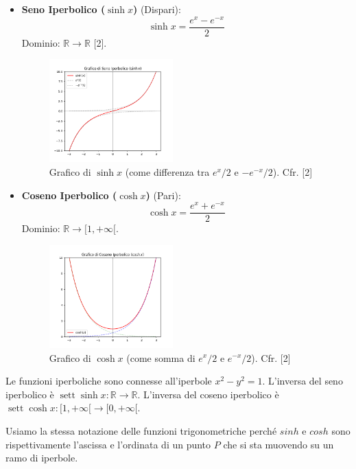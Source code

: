 \documentclass[oneside,10pt]{book} %
\begin{document}
\begin{itemize}
    \item \textbf{Seno Iperbolico ($\sinh x$)} (Dispari):
    \[ \sinh x = \frac{e^x - e^{-x}}{2} \]
    Dominio: $\mathbb{R} \to \mathbb{R}$ [2].
    
    \begin{figure}[h]
        \centering
        \includegraphics[width=0.45\textwidth]{img/grafico_senh.png} %
        \caption{Grafico di $\sinh x$ (come differenza tra $e^x/2$ e $-e^{-x}/2$). Cfr. [2]}
    \end{figure}

    \item \textbf{Coseno Iperbolico ($\cosh x$)} (Pari):
    \[ \cosh x = \frac{e^x + e^{-x}}{2} \]
    Dominio: $\mathbb{R} \to [1, +\infty[$.

    \begin{figure}[h]
        \centering
        \includegraphics[width=0.45\textwidth]{img/grafico_cosh.png} %
        \caption{Grafico di $\cosh x$ (come somma di $e^x/2$ e $e^{-x}/2$). Cfr. [2]}
    \end{figure}
\end{itemize}
Le funzioni iperboliche sono connesse all'iperbole $x^2 - y^2 = 1$. L'inversa del seno iperbolico è $\operatorname{sett}\sinh x: \mathbb{R} \to \mathbb{R}$. L'inversa del coseno iperbolico è $\operatorname{sett}\cosh x: [1, +\infty[ \to [0, +\infty[$.


  Usiamo la stessa notazione delle funzioni trigonometriche perché $sinh$ e $cosh$ sono rispettivamente l'ascissa e l'ordinata di un punto $P$ che si sta muovendo su un ramo di iperbole.
\end{document}
